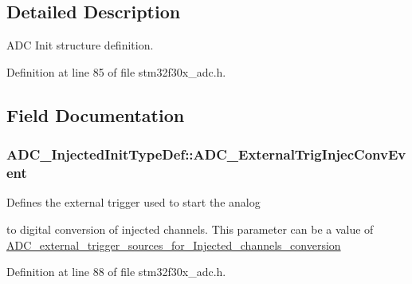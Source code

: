 \subsection{Detailed Description}
A\-D\-C Init structure definition. 

Definition at line 85 of file stm32f30x\-\_\-adc.\-h.



\subsection{Field Documentation}
\hypertarget{struct_a_d_c___injected_init_type_def_a6d873c4e8e1bba95fb54729c1cc29ae6}{
\subsubsection[{A\-D\-C\-\_\-\-External\-Trig\-Injec\-Conv\-Event}]{ A\-D\-C\-\_\-\-Injected\-Init\-Type\-Def\-::\-A\-D\-C\-\_\-\-External\-Trig\-Injec\-Conv\-Event}}\label{struct_a_d_c___injected_init_type_def_a6d873c4e8e1bba95fb54729c1cc29ae6}
\begin{DoxyVerb}     Defines the external trigger used to start the analog
\end{DoxyVerb}
 to digital conversion of injected channels. This parameter can be a value of \hyperlink{group___a_d_c__external__trigger__sources__for___injected__channels__conversion}{A\-D\-C\-\_\-external\-\_\-trigger\-\_\-sources\-\_\-for\-\_\-\-Injected\-\_\-channels\-\_\-conversion} 

Definition at line 88 of file stm32f30x\-\_\-adc.\-h.

